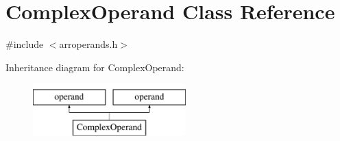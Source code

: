 \hypertarget{classComplexOperand}{}\section{Complex\+Operand Class Reference}
\label{classComplexOperand}


{\ttfamily \#include $<$arroperands.\+h$>$}

Inheritance diagram for Complex\+Operand\+:\begin{figure}[H]
\begin{center}
\leavevmode
\includegraphics[height=2.000000cm]{classComplexOperand}
\end{center}
\end{figure}
